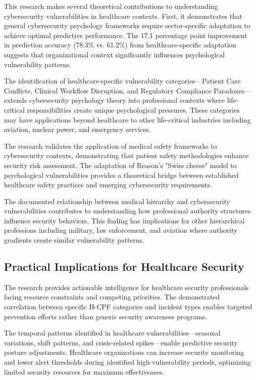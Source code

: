 \documentclass[10pt, twocolumn]{article}
\begin{document}
This research makes several theoretical contributions to understanding cybersecurity vulnerabilities in healthcare contexts. First, it demonstrates that general cybersecurity psychology frameworks require sector-specific adaptation to achieve optimal predictive performance. The 17.1 percentage point improvement in prediction accuracy (78.3\% vs. 61.2\%) from healthcare-specific adaptation suggests that organizational context significantly influences psychological vulnerability patterns.

The identification of healthcare-specific vulnerability categories—Patient Care Conflicts, Clinical Workflow Disruption, and Regulatory Compliance Paradoxes—extends cybersecurity psychology theory into professional contexts where life-critical responsibilities create unique psychological pressures. These categories may have applications beyond healthcare to other life-critical industries including aviation, nuclear power, and emergency services.

The research validates the application of medical safety frameworks to cybersecurity contexts, demonstrating that patient safety methodologies enhance security risk assessment. The adaptation of Reason's "Swiss cheese" model to psychological vulnerabilities provides a theoretical bridge between established healthcare safety practices and emerging cybersecurity requirements.

The documented relationship between medical hierarchy and cybersecurity vulnerabilities contributes to understanding how professional authority structures influence security behaviors. This finding has implications for other hierarchical professions including military, law enforcement, and aviation where authority gradients create similar vulnerability patterns.

\subsection{Practical Implications for Healthcare Security}

The research provides actionable intelligence for healthcare security professionals facing resource constraints and competing priorities. The demonstrated correlation between specific H-CPF categories and incident types enables targeted prevention efforts rather than generic security awareness programs.

The temporal patterns identified in healthcare vulnerabilities—seasonal variations, shift patterns, and crisis-related spikes—enable predictive security posture adjustments. Healthcare organizations can increase security monitoring and lower alert thresholds during identified high-vulnerability periods, optimizing limited security resources for maximum effectiveness.
\end{document}
